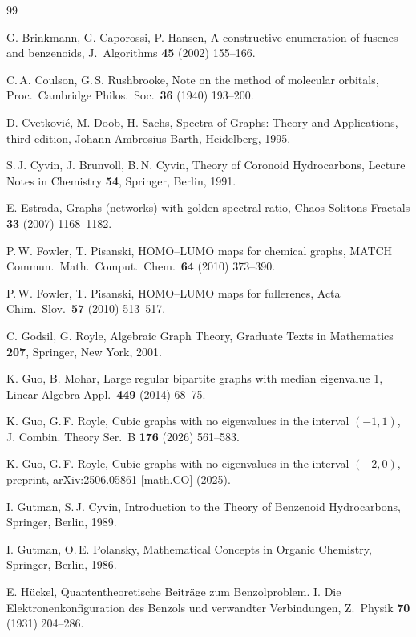 \documentclass[11pt]{article}
\theoremstyle{definition}
\begin{document}
\begin{thebibliography}{99}

G. Brinkmann, G. Caporossi, P. Hansen,
A constructive enumeration of fusenes and benzenoids,
J.\ Algorithms \textbf{45} (2002) 155--166.

C.\,A. Coulson, G.\,S. Rushbrooke,
Note on the method of molecular orbitals,
Proc.\ Cambridge Philos.\ Soc.\ \textbf{36} (1940) 193--200.

D. Cvetkovi\'c, M. Doob, H. Sachs,
Spectra of Graphs: Theory and Applications, third edition,
Johann Ambrosius Barth, Heidelberg, 1995.

S.\,J. Cyvin, J. Brunvoll, B.\,N. Cyvin,
Theory of Coronoid Hydrocarbons,
Lecture Notes in Chemistry \textbf{54}, Springer, Berlin, 1991.

E. Estrada,
Graphs (networks) with golden spectral ratio,
Chaos Solitons Fractals \textbf{33} (2007) 1168--1182.

P.\,W. Fowler, T. Pisanski,
HOMO--LUMO maps for chemical graphs,
MATCH Commun.\ Math.\ Comput.\ Chem.\ \textbf{64} (2010) 373--390.

P.\,W. Fowler, T. Pisanski,
HOMO--LUMO maps for fullerenes,
Acta Chim.\ Slov.\ \textbf{57} (2010) 513--517.

C. Godsil, G. Royle,
Algebraic Graph Theory,
Graduate Texts in Mathematics \textbf{207}, Springer, New York, 2001.

K. Guo, B. Mohar,
Large regular bipartite graphs with median eigenvalue 1,
Linear Algebra Appl.\ \textbf{449} (2014) 68--75.

K. Guo, G.\,F. Royle,
Cubic graphs with no eigenvalues in the interval $(-1,1)$,
J. Combin. Theory Ser.\ B \textbf{176} (2026) 561--583.

K. Guo, G.\,F. Royle,
Cubic graphs with no eigenvalues in the interval $(-2,0)$,
preprint, arXiv:2506.05861 [math.CO] (2025).

I. Gutman, S.\,J. Cyvin,
Introduction to the Theory of Benzenoid Hydrocarbons,
Springer, Berlin, 1989.

I. Gutman, O.\,E. Polansky,
Mathematical Concepts in Organic Chemistry,
Springer, Berlin, 1986.

E. H\"uckel,
Quantentheoretische Beitr\"age zum Benzolproblem.
I. Die Elektronenkonfiguration des Benzols und verwandter Verbindungen,
Z.\ Physik \textbf{70} (1931) 204--286.


\end{thebibliography}
\end{document}

